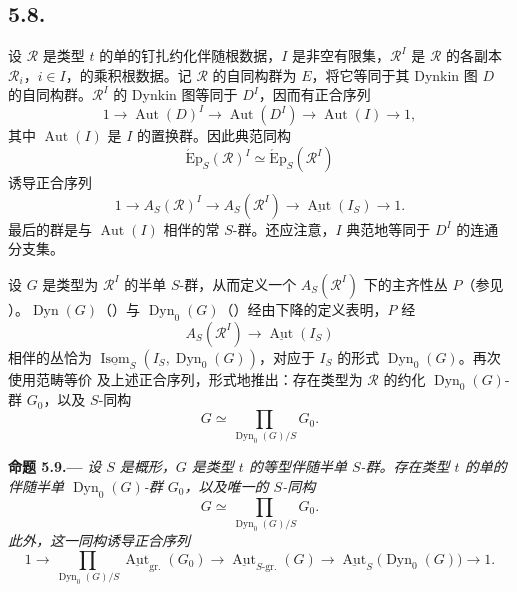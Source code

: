 \subsection*{5.8.}
设 \(\mathscr R\) 是类型 \(t\) 的单的钉扎约化伴随根数据，\(I\) 是非空有限集，\(\mathscr R^I\) 是 \(\mathscr R\) 的各副本 \(\mathscr R_i\)，\(i\in I\)，的乘积根数据。记 \(\mathscr R\) 的自同构群为 \(E\)，将它等同于其 Dynkin 图 \(D\) 的自同构群。\(\mathscr R^I\) 的 Dynkin 图等同于 \(D^I\)，因而有正合序列
\[
  1\longrightarrow\operatorname{Aut}(D)^I
  \longrightarrow\operatorname{Aut}(D^I)
  \longrightarrow\operatorname{Aut}(I)
  \longrightarrow1,
\]
其中 \(\operatorname{Aut}(I)\) 是 \(I\) 的置换群。因此典范同构
\[
  \operatorname{\acute Ep}_S(\mathscr R)^I
  \simeq
  \operatorname{\acute Ep}_S(\mathscr R^I)
\]
诱导正合序列
\[
  1\longrightarrow A_S(\mathscr R)^I
  \longrightarrow A_S(\mathscr R^I)
  \longrightarrow\underline{\operatorname{Aut}}(I_S)
  \longrightarrow1.
\]
最后的群是与 \(\operatorname{Aut}(I)\) 相伴的常 \(S\)-群。还应注意，\(I\) 典范地等同于 \(D^I\) 的连通分支集。

设 \(G\) 是类型为 \(\mathscr R^I\) 的半单 \(S\)-群，从而定义一个 \(A_S(\mathscr R^I)\) 下的主齐性丛 \(P\)（参见 ）。\(\operatorname{Dyn}(G)\)（）与 \(\operatorname{Dyn}_0(G)\)（）经由下降的定义表明，\(P\) 经
\[
  A_S(\mathscr R^I)\longrightarrow
  \underline{\operatorname{Aut}}(I_S)
\]
相伴的丛恰为 \(\underline{\operatorname{Isom}}_S(I_S,\operatorname{Dyn}_0(G))\)，对应于 \(I_S\) 的形式 \(\operatorname{Dyn}_0(G)\)。再次使用范畴等价  及上述正合序列，形式地推出：存在类型为 \(\mathscr R\) 的约化 \(\operatorname{Dyn}_0(G)\)-群 \(G_0\)，以及 \(S\)-同构
\[
  G\simeq\prod_{\operatorname{Dyn}_0(G)/S}G_0.
\]

\par\medskip\noindent{}\textbf{命题 5.9.---}\enspace
\emph{设 \(S\) 是概形，\(G\) 是类型 \(t\) 的等型伴随半单 \(S\)-群。存在类型 \(t\) 的单的伴随半单 \(\operatorname{Dyn}_0(G)\)-群 \(G_0\)，以及唯一的 \(S\)-同构}
\[
  G\simeq\prod_{\operatorname{Dyn}_0(G)/S}G_0.
\]
\emph{此外，这一同构诱导正合序列}
\[
  1\longrightarrow
  \prod_{\operatorname{Dyn}_0(G)/S}
    \underline{\operatorname{Aut}}_{\mathrm{gr.}}(G_0)
  \longrightarrow
  \underline{\operatorname{Aut}}_{S\text{-}\mathrm{gr.}}(G)
  \longrightarrow
  \underline{\operatorname{Aut}}_S\bigl(\operatorname{Dyn}_0(G)\bigr)
  \longrightarrow1.
\]


